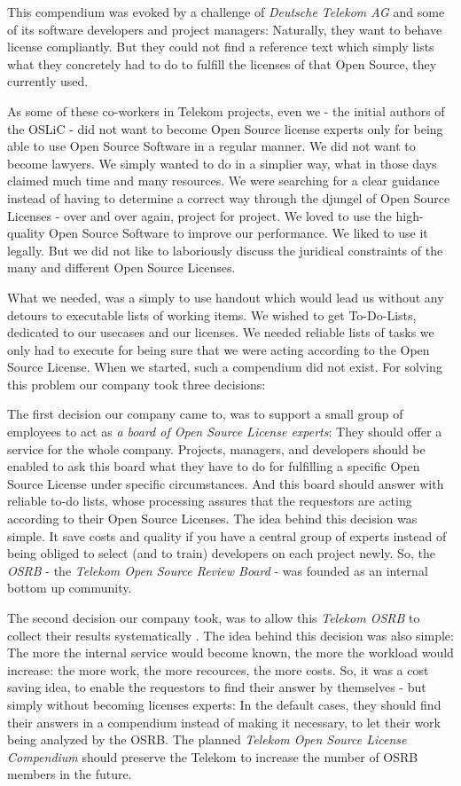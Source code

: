 This compendium was evoked by a challenge of \emph{Deutsche Telekom AG} and some
of its software developers and project managers: Naturally, they want to behave
license compliantly. But they could not find a reference text which simply lists
what they concretely had to do to fulfill the licenses of that Open Source, they
currently used.

As some of these co-workers in Telekom projects, even we - the initial authors
of the OSLiC - did not want to become Open Source license experts only for being
able to use Open Source Software in a regular manner. We did not want to become
lawyers. We simply wanted to do in a simplier way, what in those days claimed
much time and many resources. We were searching for a clear guidance instead of
having to determine a correct way through the djungel of Open Source Licenses -
over and over again, project for project. We loved to use the high-quality Open
Source Software to improve our performance. We liked to use it legally. But we
did not like to laboriously discuss the juridical constraints of the many and
different Open Source Licenses.

What we needed, was a simply to use handout which would lead us without any
detours to executable lists of working items. We wished to get To-Do-Lists,
dedicated to our usecases and our licenses. We needed reliable lists of tasks we
only had to execute for being sure that we were acting according to the Open
Source License. When we started, such a compendium did not exist. For solving
this problem our company took three decisions: 

The first decision our company came to, was to support a small group of
employees to act as \emph{a board of Open Source License experts}: They should
offer a service for the whole company. Projects, managers, and developers should
be enabled to ask this board what they have to do for fulfilling a specific Open
Source License under specific circumstances. And this board should answer with
reliable to-do lists, whose processing assures that the requestors are acting
according to their Open Source Licenses. The idea behind this decision was
simple. It save costs and quality if you have a central group of experts instead
of being obliged to select (and to train) developers on each project newly. So,
the \emph{OSRB} - the \emph{Telekom Open Source Review Board} - was founded as
an internal bottom up community.

The second decision our company took, was to allow this \emph{Telekom OSRB} to
collect their results systematically . The idea behind this decision was also
simple: The more the internal service would become known, the more the workload
would increase: the more work, the more recources, the more costs. So, it was a
cost saving idea, to enable the requestors to find their answer by themselves -
but simply without becoming licenses experts: In the default cases, they should
find their answers in a compendium instead of making it necessary, to let their
work being analyzed by the OSRB. The planned \emph{Telekom Open Source License
Compendium} should preserve the Telekom to increase the number of OSRB members in
the future.

